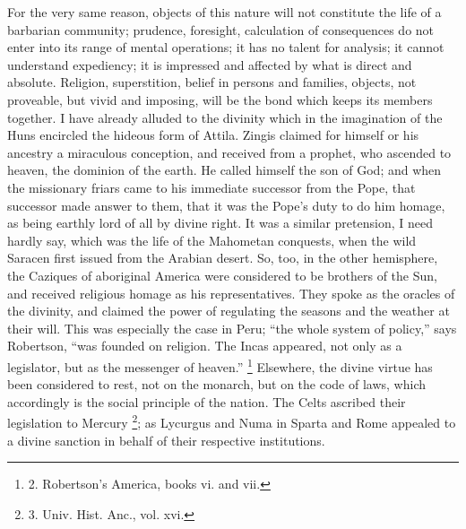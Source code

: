 For the very same reason,
objects of this nature will not constitute the life of a barbarian
community; prudence, foresight, calculation of consequences do not
enter into its range of mental operations; it has no talent for
analysis; it cannot understand expediency; it is impressed and
affected by what is direct and absolute. Religion, superstition,
belief in persons and families, objects, not proveable, but vivid and
imposing, will be the bond which keeps its members together. I have
already alluded to the divinity which in the imagination of the Huns
encircled the hideous form of Attila. Zingis claimed for himself or
his ancestry a miraculous conception, and received from a prophet, who
ascended to heaven, the dominion of the earth. He called himself the
son of God; and when the missionary friars came to his immediate
successor from the Pope, that successor made answer to them, that it
was the Pope's duty to do him homage, as being earthly lord of all by
divine right. It was a similar pretension, I need hardly say, which
was the life of the Mahometan conquests, when the wild Saracen first
issued from the Arabian desert. So, too, in the other hemisphere, the
Caziques of aboriginal America were considered to be brothers of the
Sun, and received religious homage as his representatives. They spoke
as the oracles of the divinity, and claimed the power of regulating
the seasons and the weather at their will. This was especially the
case in Peru; ``the whole system of policy,'' says Robertson, ``was
founded on religion. The Incas appeared, not only as a legislator, but
as the messenger of heaven.'' \footnote{2.
Robertson's America, books vi. and vii.}
Elsewhere, the divine virtue has been considered to rest, not on the
monarch, but on the code of laws, which accordingly is the social
principle of the nation. The Celts ascribed their legislation to
Mercury \footnote{3.
Univ. Hist. Anc., vol. xvi.}; as Lycurgus and
Numa in Sparta and Rome appealed to a divine sanction in behalf of
their respective institutions.

